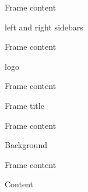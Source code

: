 \documentclass[10pt,xcolor=pdftex,dvipsnames,table,handout]{beamer}
\begin{document}
		\begin{frame}[t]{Frame content}

			\begin{block} {left and right sidebars}
			\end{block}

		\end{frame}


		\begin{frame}[t]{Frame content}

			\begin{block} {logo}
			\end{block}

		\end{frame}

		\begin{frame}[t]{Frame content}

			\begin{block} {Frame title}
			\end{block}

		\end{frame}


		\begin{frame}[t]{Frame content}

			\begin{block} {Background}
			\end{block}

		\end{frame}


		\begin{frame}[t]{Frame content}

			\begin{block} {Content}
			\end{block}

		\end{frame}
\end{document}
